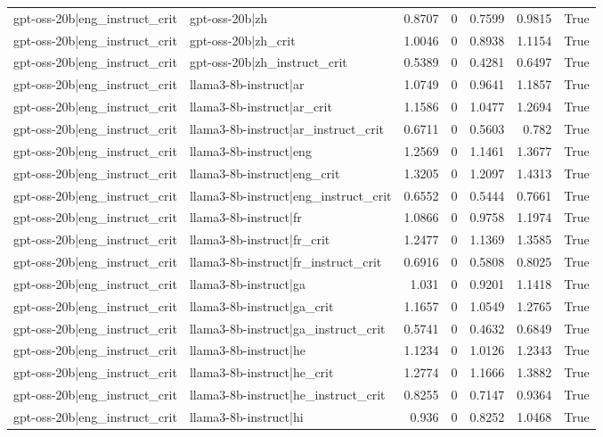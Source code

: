 \begin{table}
\begin{tabular}{l l r r r r l}
gpt-oss-20b|eng_instruct_crit & gpt-oss-20b|zh & 0.8707 & 0 & 0.7599 & 0.9815 & True \\
gpt-oss-20b|eng_instruct_crit & gpt-oss-20b|zh_crit & 1.0046 & 0 & 0.8938 & 1.1154 & True \\
gpt-oss-20b|eng_instruct_crit & gpt-oss-20b|zh_instruct_crit & 0.5389 & 0 & 0.4281 & 0.6497 & True \\
gpt-oss-20b|eng_instruct_crit & llama3-8b-instruct|ar & 1.0749 & 0 & 0.9641 & 1.1857 & True \\
gpt-oss-20b|eng_instruct_crit & llama3-8b-instruct|ar_crit & 1.1586 & 0 & 1.0477 & 1.2694 & True \\
gpt-oss-20b|eng_instruct_crit & llama3-8b-instruct|ar_instruct_crit & 0.6711 & 0 & 0.5603 & 0.782 & True \\
gpt-oss-20b|eng_instruct_crit & llama3-8b-instruct|eng & 1.2569 & 0 & 1.1461 & 1.3677 & True \\
gpt-oss-20b|eng_instruct_crit & llama3-8b-instruct|eng_crit & 1.3205 & 0 & 1.2097 & 1.4313 & True \\
gpt-oss-20b|eng_instruct_crit & llama3-8b-instruct|eng_instruct_crit & 0.6552 & 0 & 0.5444 & 0.7661 & True \\
gpt-oss-20b|eng_instruct_crit & llama3-8b-instruct|fr & 1.0866 & 0 & 0.9758 & 1.1974 & True \\
gpt-oss-20b|eng_instruct_crit & llama3-8b-instruct|fr_crit & 1.2477 & 0 & 1.1369 & 1.3585 & True \\
gpt-oss-20b|eng_instruct_crit & llama3-8b-instruct|fr_instruct_crit & 0.6916 & 0 & 0.5808 & 0.8025 & True \\
gpt-oss-20b|eng_instruct_crit & llama3-8b-instruct|ga & 1.031 & 0 & 0.9201 & 1.1418 & True \\
gpt-oss-20b|eng_instruct_crit & llama3-8b-instruct|ga_crit & 1.1657 & 0 & 1.0549 & 1.2765 & True \\
gpt-oss-20b|eng_instruct_crit & llama3-8b-instruct|ga_instruct_crit & 0.5741 & 0 & 0.4632 & 0.6849 & True \\
gpt-oss-20b|eng_instruct_crit & llama3-8b-instruct|he & 1.1234 & 0 & 1.0126 & 1.2343 & True \\
gpt-oss-20b|eng_instruct_crit & llama3-8b-instruct|he_crit & 1.2774 & 0 & 1.1666 & 1.3882 & True \\
gpt-oss-20b|eng_instruct_crit & llama3-8b-instruct|he_instruct_crit & 0.8255 & 0 & 0.7147 & 0.9364 & True \\
gpt-oss-20b|eng_instruct_crit & llama3-8b-instruct|hi & 0.936 & 0 & 0.8252 & 1.0468 & True \\

\end{tabular}
\end{table}
